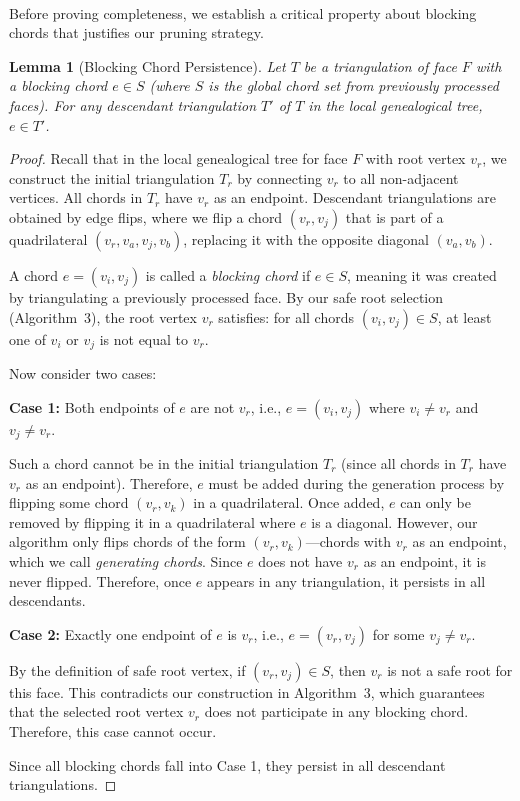 ﻿﻿\documentclass[12pt,a4paper]{article}
\newtheorem{lemma}[theorem]{Lemma}
\theoremstyle{definition}
\theoremstyle{remark}
\begin{document}
Before proving completeness, we establish a critical property about blocking chords that justifies our pruning strategy.

\begin{lemma}[Blocking Chord Persistence]
	\label{lem:blocking_persistence}
	Let $T$ be a triangulation of face $F$ with a blocking chord $e \in S$ (where $S$ is the global chord set from previously processed faces). For any descendant triangulation $T'$ of $T$ in the local genealogical tree, $e \in T'$.
\end{lemma}

\begin{proof}
	Recall that in the local genealogical tree for face $F$ with root vertex $v_r$, we construct the initial triangulation $T_r$ by connecting $v_r$ to all non-adjacent vertices. All chords in $T_r$ have $v_r$ as an endpoint. Descendant triangulations are obtained by edge flips, where we flip a chord $(v_r, v_j)$ that is part of a quadrilateral $(v_r, v_a, v_j, v_b)$, replacing it with the opposite diagonal $(v_a, v_b)$.

	A chord $e = (v_i, v_j)$ is called a \textit{blocking chord} if $e \in S$, meaning it was created by triangulating a previously processed face. By our safe root selection (Algorithm~3), the root vertex $v_r$ satisfies: for all chords $(v_i, v_j) \in S$, at least one of $v_i$ or $v_j$ is not equal to $v_r$.

	Now consider two cases:

	\textbf{Case 1:} Both endpoints of $e$ are not $v_r$, i.e., $e = (v_i, v_j)$ where $v_i \neq v_r$ and $v_j \neq v_r$.

	Such a chord cannot be in the initial triangulation $T_r$ (since all chords in $T_r$ have $v_r$ as an endpoint). Therefore, $e$ must be added during the generation process by flipping some chord $(v_r, v_k)$ in a quadrilateral. Once added, $e$ can only be removed by flipping it in a quadrilateral where $e$ is a diagonal. However, our algorithm only flips chords of the form $(v_r, v_k)$---chords with $v_r$ as an endpoint, which we call \textit{generating chords}. Since $e$ does not have $v_r$ as an endpoint, it is never flipped. Therefore, once $e$ appears in any triangulation, it persists in all descendants.

	\textbf{Case 2:} Exactly one endpoint of $e$ is $v_r$, i.e., $e = (v_r, v_j)$ for some $v_j \neq v_r$.

	By the definition of safe root vertex, if $(v_r, v_j) \in S$, then $v_r$ is not a safe root for this face. This contradicts our construction in Algorithm~3, which guarantees that the selected root vertex $v_r$ does not participate in any blocking chord. Therefore, this case cannot occur.

	Since all blocking chords fall into Case 1, they persist in all descendant triangulations.
\end{proof}
\end{document}
